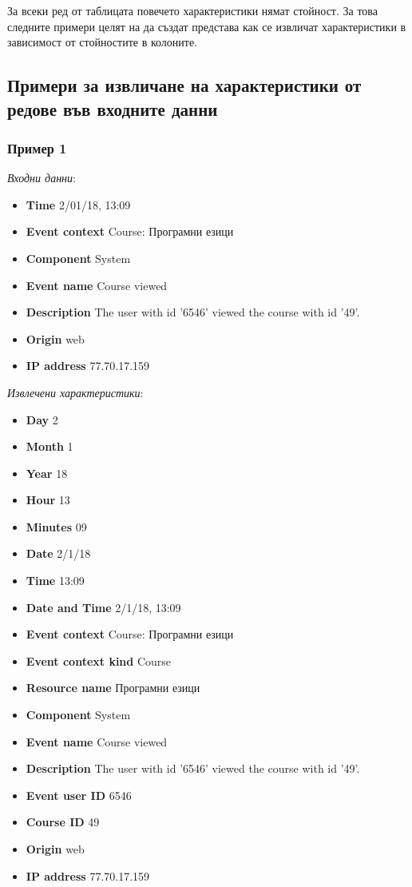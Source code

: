 \documentclass[a4paper, 12pt]{article}
\begin{document}
За всеки ред от таблицата повечето характеристики нямат стойност.
За това следните примери целят на да създат представа как се извличат характеристики в зависимост от стойностите в колоните.

\subsection{Примери за извличане на характеристики от редове във входните данни}
\subsubsection{Пример 1}
\textit{Входни данни}:		
\begin{itemize}
\item \textbf{Time} 2/01/18, 13:09
\item \textbf{Event context} Course: Програмни езици
\item \textbf{Component} System
\item \textbf{Event name} Course viewed
\item \textbf{Description} The user with id '6546' viewed the course with id '49'.
\item \textbf{Origin} web
\item \textbf{IP address} 77.70.17.159
\end{itemize}

\textit{Извлечени характеристики}:
\begin{itemize}
\item \textbf{Day} 2
\item \textbf{Month} 1
\item \textbf{Year} 18
\item \textbf{Hour} 13
\item \textbf{Minutes} 09
\item \textbf{Date} 2/1/18
\item \textbf{Time} 13:09
\item \textbf{Date and Time} 2/1/18, 13:09
\item \textbf{Event context} Course: Програмни езици
\item \textbf{Event context kind} Course
\item \textbf{Resource name} Програмни езици
\item \textbf{Component} System
\item \textbf{Event name} Course viewed
\item \textbf{Description} The user with id '6546' viewed the course with id '49'.
\item \textbf{Event user ID} 6546
\item \textbf{Course ID} 49
\item \textbf{Origin} web
\item \textbf{IP address} 77.70.17.159
\end{itemize}
\end{document}
